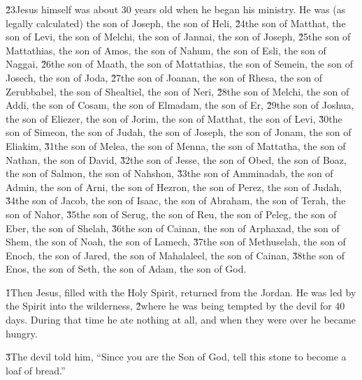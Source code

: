 \v{23}Jesus himself was about 30 years old when he began his ministry. He was (as legally calculated) the son of Joseph, the son of Heli, \v{24}the son of Matthat, the son of Levi, the son of Melchi, the son of Jannai, the son of Joseph, \v{25}the son of Mattathias, the son of Amos, the son of Nahum, the son of Esli, the son of Naggai, \v{26}the son of Maath, the son of Mattathias, the son of Semein, the son of Josech, the son of Joda, \v{27}the son of Joanan, the son of Rhesa, the son of Zerubbabel, the son of Shealtiel, the son of Neri, \v{28}the son of Melchi, the son of Addi, the son of Cosam, the son of Elmadam, the son of Er, \v{29}the son of Joshua, the son of Eliezer, the son of Jorim, the son of Matthat, the son of Levi, \v{30}the son of Simeon, the son of Judah, the son of Joseph, the son of Jonam, the son of Eliakim, \v{31}the son of Melea, the son of Menna, the son of Mattatha, the son of Nathan, the son of David, \v{32}the son of Jesse, the son of Obed, the son of Boaz, the son of Salmon, the son of Nahshon, \v{33}the son of Amminadab, the son of Admin, the son of Arni, the son of Hezron, the son of Perez, the son of Judah, \v{34}the son of Jacob, the son of Isaac, the son of Abraham, the son of Terah, the son of Nahor, \v{35}the son of Serug, the son of Reu, the son of Peleg, the son of Eber, the son of Shelah, \v{36}the son of Cainan, the son of Arphaxad, the son of Shem, the son of Noah, the son of Lamech, \v{37}the son of Methuselah, the son of Enoch, the son of Jared, the son of Mahalaleel, the son of Cainan, \v{38}the son of Enos, the son of Seth, the son of Adam, the son of God.

\v{1}Then Jesus, filled with the Holy Spirit, returned from the Jordan. He was led by the Spirit into the wilderness, \v{2}where he was being tempted by the devil for 40 days. During that time he ate nothing at all, and when they were over he became hungry.

\v{3}The devil told him, ``Since you are the Son of God, tell this stone to become a loaf of bread.''

